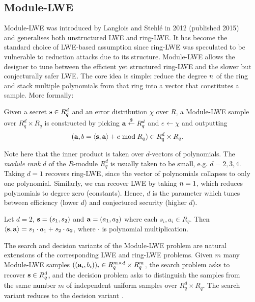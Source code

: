 \subsection{Module-LWE}
Module-LWE was introduced by Langlois and Stehlé in 2012 \cite{ls15} (published 2015) and generalises both unstructured LWE and ring-LWE. It has become the standard choice of LWE-based assumption since ring-LWE was speculated to be vulnerable to reduction attacks due to its structure. Module-LWE allows the designer to tune between the efficient yet structured ring-LWE and the slower but conjecturally safer LWE. The core idea is simple: reduce the degree $n$ of the ring and stack multiple polynomials from that ring into a vector that constitutes a sample. More formally:

\begin{definition}
    Given a secret $\mathbf{s} \in R_q^d$ and an error distribution $\chi$ over $R$, a Module-LWE sample over $R_q^d \times R_q$ is constructed by picking $\mathbf{a} \overset{\$}{\leftarrow} R_q^d$ and $e \leftarrow \chi$ and outputting
    \[ (\mathbf{a}, b = \langle \mathbf{s}, \mathbf{a} \rangle + e \mathrm{\; mod \;} R_q) \in R_q^d \times R_q. \]
\end{definition}

Note here that the inner product is taken over $d$-vectors of polynomials. The \textit{module rank} $d$ of the $R$-module $R_q^d$ is usually taken to be small, e.g. $d = 2,3,4$. Taking $d = 1$ recovers ring-LWE, since the vector of polynomials collapses to only one polynomial. Similarly, we can recover LWE by taking $n = 1$, which reduces polynomials to degree zero (constants). Hence, $d$ is the parameter which tunes between efficiency (lower $d$) and conjectured security (higher $d$).

\begin{example}
    Let $d = 2$, $\mathbf{s} = (s_1, s_2)$ and $\mathbf{a} = (a_1, a_2)$ where each $s_i, a_i \in R_q$. Then $\langle \mathbf{s}, \mathbf{a} \rangle = s_1 \cdot a_1 + s_2 \cdot a_2$, where $\cdot$ is polynomial multiplication.
\end{example}

The search and decision variants of the Module-LWE problem are natural extensions of the corresponding LWE and ring-LWE problems. Given $m$ many Module-LWE samples $((\mathbf{a}_i, b_i))_i \in R_q^{m \times d} \times R_q^m$, the search problem asks to recover $\mathbf{s} \in R_q^d$, and the decision problem asks to distinguish the samples from the same number $m$ of independent uniform samples over $R_q^d \times R_q$. The search variant reduces to the decision variant \cite{ls15}.

